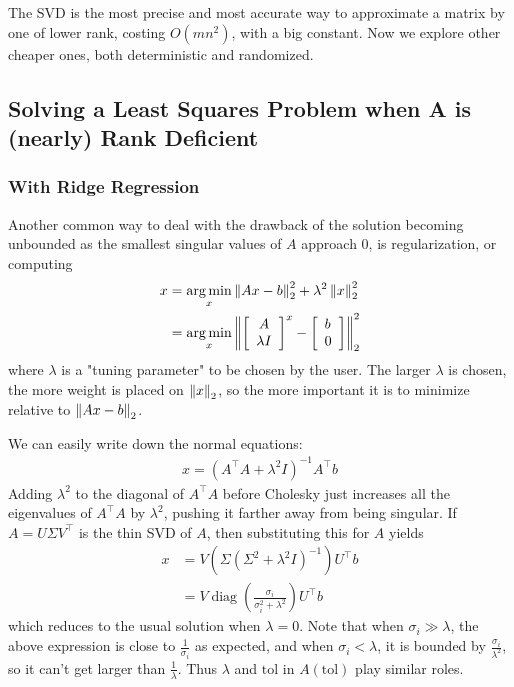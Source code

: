 \documentclass[11pt]{article}
\numberwithin{equation}{section}
\begin{document}
The SVD is the most precise and most accurate way to approximate a matrix by one of lower rank, costing $O(mn^2)$, with a big constant. 
Now we explore other cheaper ones, both deterministic and randomized.

\subsection{Solving a Least Squares Problem when A is (nearly) Rank Deficient}
\subsubsection{With Ridge Regression}
Another common way to deal with the drawback of the solution becoming unbounded as the smallest singular values of $A$ approach 0, is regularization, or computing
\begin{align*}
    x &= \underset{x}{\arg \min}\left\| Ax-b \right\|_2^2 + \lambda^2 \left\| x \right\|_2^2 \\
    &= \underset{x}{\arg \min}\left\| \left[\begin{array}{c}
        A \\
        \lambda I
        \end{array}\right]^{x}-\left[\begin{array}{l}
        b \\
        0
        \end{array}\right] \right\|_2^2
\end{align*}
where $\lambda$ is a "tuning parameter" to be chosen by the user. The larger $\lambda$ is chosen, the more weight is placed on $\left\| x \right\|_2$, 
so the more important it is to minimize relative to $\left\| Ax-b \right\|_2$.

We can easily write down the normal equations: \begin{align*}
    x=\left(A^{\top} A+\lambda^{2} I\right)^{-1} A^{\top} b
\end{align*}
Adding $\lambda^2$ to the diagonal of $A^\top A$ before Cholesky just increases all the eigenvalues of $A^\top A$ by $\lambda^2$, pushing it farther away from being singular.
If $A = U\Sigma V^\top$ is the thin SVD of $A$, then substituting this for $A$ yields \begin{align*}
    x &= V(\Sigma (\Sigma^2 + \lambda^2 I)^{-1} ) U^{\top} b \\
    &= V \operatorname{diag}\left( \frac{\sigma_i}{\sigma_i^2 + \lambda^2} \right)U^{\top} b 
\end{align*}
which reduces to the usual solution when $\lambda = 0$. Note that when $\sigma_i \gg \lambda$, the above expression is close to $\frac{1}{\sigma_i}$ as expected,
and when $\sigma_i < \lambda$, it is bounded by $\frac{\sigma_i}{\lambda^2}$, so it can't get larger than $\frac{1}{\lambda}$. 
Thus $\lambda$ and $\mathrm{tol}$ in $A(\mathrm{tol})$ play similar roles.
\end{document}
